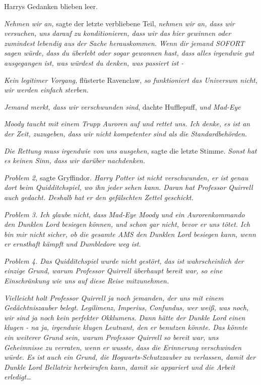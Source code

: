 {Harrys Gedanken blieben leer.

\emph{Nehmen wir an,} sagte der letzte verbliebene Teil, \emph{nehmen wir an, dass wir versuchen, uns darauf zu konditionieren, dass wir das hier gewinnen oder zumindest lebendig aus der Sache herauskommen. Wenn dir jemand SOFORT sagen würde, dass du überlebt oder sogar gewonnen hast, dass alles irgendwie gut ausgegangen ist, was würdest du denken, was passiert ist -}

\emph{Kein legitimer Vorgang,} flüsterte Ravenclaw, \emph{so funktioniert das Universum nicht, wir werden einfach sterben.}

\emph{\hfill\break Jemand merkt, dass wir verschwunden sind}, dachte Hufflepuff, \emph{und Mad-Eye}

\emph{Moody taucht mit einem Trupp Auroren auf und rettet uns. Ich denke, es ist an der Zeit, zuzugeben, dass wir nicht kompetenter sind als die Standardbehörden.}

\emph{Die Rettung muss irgendwie von uns ausgehen,} sagte die letzte Stimme. \emph{Sonst hat es keinen Sinn, dass wir darüber nachdenken.}

\emph{Problem 2,} sagte Gryffindor. \emph{Harry Potter ist nicht verschwunden, er ist genau dort beim Quidditchspiel, wo ihn jeder sehen kann. Daran hat Professor Quirrell auch gedacht. Deshalb hat er den gefälschten Zettel geschickt.}

\emph{Problem 3. Ich glaube nicht, dass Mad-Eye Moody und ein Aurorenkommando den Dunklen Lord besiegen können, und schon gar nicht, bevor er uns tötet. Ich bin mir nicht sicher, ob die gesamte AMS den Dunklen Lord besiegen kann, wenn er ernsthaft kämpft und Dumbledore weg ist.}

\emph{Problem 4. Das Quidditchspiel wurde nicht gestört, das ist wahrscheinlich der einzige Grund, warum Professor Quirrell überhaupt bereit war, so eine Einschränkung wie uns auf diese Reise mitzunehmen.}

\emph{Vielleicht holt Professor Quirrell ja noch jemanden, der uns mit einem Gedächtniszauber belegt. Legilimenz, Imperius, Confundus, wer weiß, was noch, wir sind ja noch kein perfekter Okklumens. Dann hätte der Dunkle Lord einen klugen - na ja, irgendwie klugen Leutnant, den er benutzen könnte. Das könnte ein weiterer Grund sein, warum Professor Quirrell so bereit war, uns Geheimnisse zu verraten, wenn er wusste, dass die Erinnerung verschwinden würde. Es ist auch ein Grund, die Hogwarts-Schutzzauber zu verlassen, damit der Dunkle Lord Bellatrix herbeirufen kann, damit sie appariert und die Arbeit erledigt…}

}
